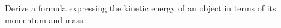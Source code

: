         Derive a formula expressing the kinetic energy of an
        object in terms of its momentum and mass.\answercheck
